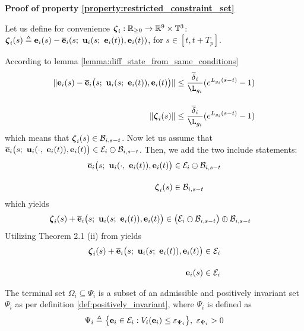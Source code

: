 \begin{gg_box}
\textbf{Proof of property \eqref{property:restricted_constraint_set}}

Let us define for convenience $\bm{\mathbf{\zeta}}_i : \mathbb{R}_{\geq 0} \to \mathbb{R}^9 \times \mathbb{T}^3$:
$\bm{\mathbf{\zeta}}_i(s) \triangleq \bm{\mathbf{e}}_i(s) - \overline{\bm{\mathbf{e}}}_i(s;\ \bm{\mathbf{u}}_i(s;\ \bm{\mathbf{e}}_i(t)), \bm{\mathbf{e}}_i(t))$,
for $s \in [t, t + T_p]$.

According to lemma
\eqref{lemma:diff_state_from_same_conditions}
\begin{align}
 \|\vect{e}_i(s) - \overline{\vect{e}}_i\big(s;\ \vect{u}_i(s;\ \vect{e}_i(t)), \vect{e}_i(t)\big)\|
   &\leq \dfrac{\overline{\delta}_i}{\L_{g_i}} (e^{L_{g_i} (s-t)} - 1) \\[2.5ex]
 \|\vect{\zeta}_i(s)\| &\leq \dfrac{\overline{\delta}_i}{\L_{g_i}} (e^{L_{g_i} (s-t)} - 1)
\end{align}
which means that $\bm{\mathbf{\zeta}}_i(s) \in \mathcal{B}_{i,s-t}$.
Now let us assume that
$\overline{\vect{e}}_i\big( s;\ \vect{u}_i(\cdot,\ \vect{e}_i(t)), \vect{e}_i(t) \big) \in \mathcal{E}_i \ominus \mathcal{B}_{i,s-t}$.
Then, we add the two include statements:
\begin{align}
  \overline{\bm{\mathbf{e}}}_i\big( s;\ \bm{\mathbf{u}}_i(\cdot,\ \bm{\mathbf{e}}_i(t)), \bm{\mathbf{e}}_i(t) \big) &\in \mathcal{E}_i \ominus \mathcal{B}_{i,s-t} \\[2.5ex]
  \bm{\mathbf{\zeta}}_i(s) &\in \mathcal{B}_{i,s-t}
\end{align}
which yields
\begin{align}
  \vect{\zeta}_i(s) + \overline{\vect{e}}_i\big(s;\ \vect{u}_i(s;\ \vect{e}_i(t)), \vect{e}_i(t)\big)
    &\in \big(\mathcal{E}_i \ominus \mathcal{B}_{i,s-t}\big) \oplus \mathcal{B}_{i,s-t}
\end{align}
Utilizing Theorem 2.1 (ii) from \cite{kolmanovsky} yields
\begin{align}
  \vect{\zeta}_i(s) + \overline{\vect{e}}_i\big(s;\ \vect{u}_i(s;\ \vect{e}_i(t)), \vect{e}_i(t)\big) &\in \mathcal{E}_i \\[2.5ex]
  \vect{e}_i(s) &\in \mathcal{E}_i
\end{align}
\qedsymbol
\end{gg_box}

The terminal set $\Omega_i \subseteq \Psi_i$ is a subset of an admissible and
positively invariant set $\Psi_i$ as per definition
\eqref{def:positively_invariant}, where $\Psi_i$ is defined as
\begin{align}
  \Psi_i \triangleq \big\{\bm{\mathbf{e}}_i \in \mathcal{E}_i : V_i(\bm{\mathbf{e}}_i)
    \leq \varepsilon_{\Psi_i} \big\},\ \varepsilon_{\Psi_i} > 0
\end{align}

